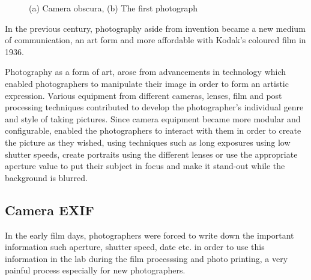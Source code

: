\begin{figure}[h!]
    \centering  
    \caption{(a) Camera obscura, (b) The first photograph}
    \label{c2:dark_room_photo}
\end{figure}

In the previous century, photography aside from invention became a new medium of communication, an art form and more affordable with Kodak's coloured film in 1936.

Photography as a form of art, arose from advancements in technology which enabled photographers to manipulate their image in order to form an artistic expression. Various equipment from different cameras, lenses, film and post processing techniques contributed to develop the photographer's individual genre and style of taking pictures. Since camera equipment became more modular and configurable, enabled the photographers to interact with them in order to create the picture as they wished, using techniques such as long exposures using low shutter speeds, create portraits using the different lenses or use the appropriate aperture value to put their subject in focus and make it stand-out while the background is blurred.

\subsection{Camera EXIF}

In the early film days, photographers were forced to write down the important information such aperture, shutter speed, date etc. in order to use this information in the lab during the film processsing and photo printing, a very painful process especially for new photographers.


